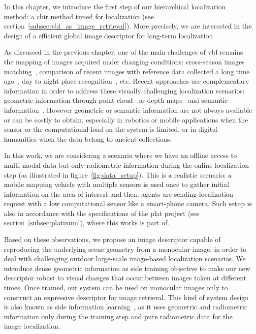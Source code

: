 In this chapter, we introduce the first step of our hierarchical localization method: a \ac{cbir} method tuned for localization (see section~\ref{subsec:vbl_as_image_retrieval}). More precisely, we are interested in the design of a efficient global image descriptor for long-term localization.

As discussed in the previous chapter, one of the main challenges of \ac{vbl} remains the mapping of images acquired under changing conditions: cross-season images matching~\cite{Naseer2017a}, comparison of recent images with reference data collected a long time ago~\cite{Toft2018}, day to night place recognition~\cite{Torii2015}, etc. Recent approaches use complementary information in order to address these visually challenging localization scenarios: geometric information through point cloud~\cite{Sattler2018,Schonberger2017a} or depth maps~\cite{Christie2016} and semantic information~\cite{Ardeshir2014,Christie2016,Naseer2017a}. However geometric or semantic information are not always available or can be costly to obtain, especially in robotics or mobile applications when the sensor or the computational load on the system is limited, or in digital humanities when the data belong to ancient collections. 

In this work, we are considering a scenario where we have an offline access to multi-modal data but only-radiometric information during the online localization step (as illustrated in figure~\ref{fig:data_setup}). This is a realistic scenario: a mobile mapping vehicle with multiple sensors is used once to gather initial information on the area of interest and then, agents are sending localization request with a low computational sensor like a smart-phone camera. Such setup is also in accordance with the specifications of the \ac{plat} project (see section~\ref{subsec:platinum}), where this works is part of.

Based on these observations, we propose an image descriptor capable of reproducing the underlying scene geometry from a monocular image, in order to deal with challenging outdoor large-scale image-based localization scenarios. We introduce dense geometric information as side training objective to make our new descriptor robust to visual changes that occur between images taken at different times. Once trained, our system can be used on monocular images only to construct an expressive descriptor for image retrieval. This kind of system design is also known as side information learning~\cite{Hoffman2016}, as it uses geometric and radiometric information only during the training step and pure radiometric data for the image localization.  

